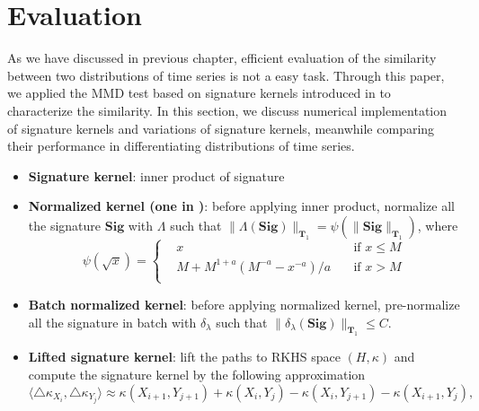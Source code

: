 \documentclass[12pt]{report}
\theoremstyle{definition}
\theoremstyle{remark}
\begin{document}
\section{Evaluation}
As we have discussed in previous chapter, efficient evaluation of the similarity between two distributions of time series is not a easy task. Through this paper, we applied the MMD test based on signature kernels introduced in \cite{chevyrev2018signature} to characterize the similarity. In this section, we discuss numerical implementation of signature kernels and variations of signature kernels, meanwhile comparing their performance in differentiating distributions of time series. 
\begin{itemize}
     \item \textbf{Signature kernel}: inner product of signature 
     \item \textbf{Normalized kernel (one in \cite{chevyrev2018signature})}: before applying inner product, normalize all the signature $\mathbf{Sig}$ with $\Lambda$ such that $\lVert \Lambda(\mathbf{Sig})\rVert_{\mathbf{T}_{1}} = \psi(\lVert \mathbf{Sig}\rVert_{\mathbf{T}_{1}})$, where 
     \begin{equation*}
       \psi(\sqrt{x}) = \left\{\begin{aligned}
         &x  &\text{if } x\leq M\\
         &M + M^{1+a}(M^{-a} - x^{-a})/a\quad &\text{if } x> M\\
       \end{aligned}\right.
     \end{equation*}
     \item \textbf{Batch normalized kernel}: before applying normalized kernel, pre-normalize all the signature in batch with $\delta_{\lambda}$ such that $\lVert \delta_{\lambda}(\mathbf{Sig})\rVert_{\mathbf{T}_{1}} \leq C$.
     \item \textbf{Lifted signature kernel}: lift the paths to RKHS space $(H,\kappa)$ and compute the signature kernel by the following approximation
     \begin{equation}\label{approkernel}
      \langle\triangle\kappa_{X_{i}}, \triangle\kappa_{Y_{j}}\rangle\approx\kappa(X_{i+1},Y_{j+1}) + \kappa(X_{i},Y_{j}) - \kappa(X_{i},Y_{j+1}) - \kappa(X_{i+1},Y_{j}),
    \end{equation}
\end{itemize}
\end{document}

